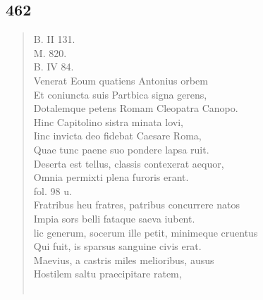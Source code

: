 \documentclass[11pt, a4paper]{report}
\begin{document}
            \subsection*{462}
      \begin{verse}
      B. II 131. \\ M. 820. \\ B. IV 84. \\ Venerat Eoum quatiens Antonius orbem \\ Et coniuncta suis Partbica signa gerens, \\ Dotalemque petens Romam Cleopatra Canopo. \\ Hinc Capitolino sistra minata lovi, \\ Iinc invicta deo fidebat Caesare Roma, \\ Quae tunc paene suo pondere lapsa ruit. \\ Deserta est tellus, classis contexerat aequor, \\ Omnia permixti plena furoris erant. \\ fol. 98 u. \\ Fratribus heu fratres, patribus concurrere natos \\ Impia sors belli fataque saeva iubent. \\ lic generum, socerum ille petit, minimeque cruentus \\ Qui fuit,  \lbrack is \rbrack  sparsus sanguine civis erat. \\ Maevius, a castris miles melioribus, ausus \\ Hostilem saltu praecipitare ratem, \\ 
        ﻿\pagebreak 

\end{verse}
\end{document}
